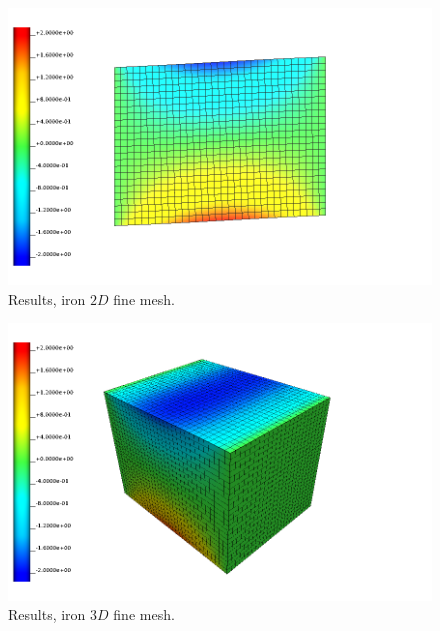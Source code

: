 %
\begin{figure}[h!]
    \centering 
    \includegraphics[width=\columnwidth]{examples/example-0102/doc/figures/l160x120x000_n32x24x00_i1_s0_shear.png} 
    \caption{Results, iron $2D$ fine mesh.}
    \label{example-0102-iron-2D-fig}
\end{figure}
%
\begin{figure}[h!]
    \centering 
    \includegraphics[width=\columnwidth]{examples/example-0102/doc/figures/l160x120x120_n32x24x24_i1_s0_shear.png} 
    \caption{Results, iron $3D$ fine mesh.}
    \label{example-0102-iron-3D-fig}
\end{figure}
